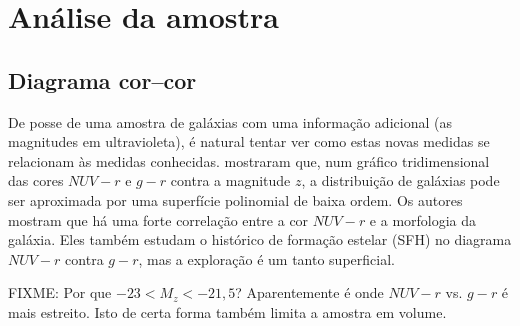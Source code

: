 



\chapter{Análise da amostra}
\label{sec:Analise}

\section{Diagrama cor--cor}

De posse de uma amostra de galáxias com uma informação adicional (as magnitudes
em ultravioleta), é natural tentar ver como estas novas medidas se relacionam às
medidas conhecidas. \citet{Chilingarian2011} mostraram que, num gráfico
tridimensional das cores $NUV-r$ e $g-r$ contra a magnitude $z$, a distribuição
de galáxias pode ser aproximada por uma superfície polinomial de baixa ordem. Os
autores mostram que há uma forte correlação entre a cor $NUV-r$ e a morfologia
da galáxia. Eles também estudam o histórico de formação estelar (SFH) no
diagrama $NUV-r$ contra $g-r$, mas a exploração é um tanto superficial.

FIXME: Por que $-23 < M_z < -21,5$? Aparentemente é onde $NUV-r$ vs. $g-r$ é
mais estreito. Isto de certa forma também limita a amostra em volume.


